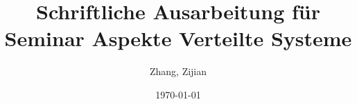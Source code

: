 \documentclass[a4paper,twoside,11pt]{book}
\title{Schriftliche Ausarbeitung für Seminar Aspekte Verteilte Systeme}
\author{Zhang, Zijian}
\date{\today}
\renewcommand{\headrulewidth}{0pt}
\begin{document}
\frontmatter

\fancyfoot[C]{\thepage}

\tableofcontents

\makeatletter
\@openrightfalse
\makeatother

\listoffigures

\listoftables

\renewcommand*{\lstlistlistingname}{Codeverzeichniss}
\lstlistoflistings

\printnoidxglossaries


\mainmatter
\renewcommand{\headrulewidth}{0.4pt}

\makeatletter
\@openrighttrue
\makeatother








\appendix






\end{document}
